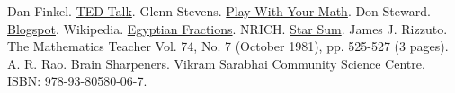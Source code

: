 \documentclass[12pt]{exam}         %
\begin{document}
\newpage
\begin{thebibliography}{00}
     Dan Finkel. \href{https://www.ted.com/talks/dan_finkel_5_ways_to_share_math_with_kids/transcript?language=en}{TED Talk}.
     Glenn Stevens. \href{https://playwithyourmath.com/2020/02/09/24-plus-minus/}{Play With Your Math}.
     Don Steward. \href{https://donsteward.blogspot.com/}{Blogspot}.
     Wikipedia. \href{https://en.wikipedia.org/wiki/Egyptian_fraction}{Egyptian Fractions}.
     NRICH. \href{https://nrich.maths.org/2206}{Star Sum}.
     James J. Rizzuto.  The Mathematics Teacher Vol. 74, No. 7 (October 1981), pp. 525-527 (3 pages).
     A. R. Rao. Brain Sharpeners. Vikram Sarabhai Community Science Centre. ISBN: 978-93-80580-06-7.
\end{thebibliography}
\end{document}
